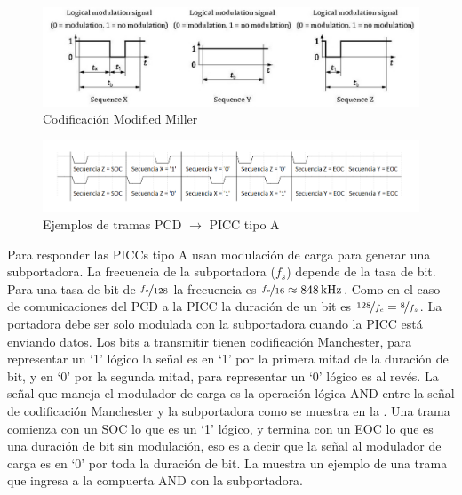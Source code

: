 \documentclass[a4paper, twoside, 11pt]{report}
\begin{document}
\begin{figure}[htb]
  \centering
  \includegraphics[scale=0.5]{./img/sequences}
  \caption{Codificación Modified Miller~\cite{iso14443-2}}
  \label{fig:sequences}
\end{figure}

\begin{figure}[htb]
  \centering
  \includegraphics[scale=0.45]{./img/rx_frame_examples}
  \caption{Ejemplos de tramas PCD $\rightarrow$ PICC tipo A}
  \label{fig:rx_frame_examples}
\end{figure}

\FloatBarrier

Para responder las PICCs tipo A usan modulación de carga para generar una subportadora.  La frecuencia de la subportadora ($f_s$) depende de la tasa de bit. Para una tasa de bit de $\nicefrac{f_c}{128}$ la frecuencia es $\nicefrac{f_c}{16} \approx \SI{848}{\kilo\hertz}$. Como en el caso de comunicaciones del PCD a la PICC la duración de un bit es $\nicefrac{128}{f_c} = \nicefrac{8}{f_s}$. La portadora debe ser solo modulada con la subportadora cuando la PICC está enviando datos. Los bits a transmitir tienen codificación Manchester, para representar un ‘1’ lógico la señal es en ‘1’ por la primera mitad de la duración de bit, y en ‘0’ por la segunda mitad, para representar un ‘0’ lógico es al revés. La señal que maneja el modulador de carga es la operación lógica AND entre la señal de codificación Manchester y la subportadora como se muestra en la . Una trama comienza con un SOC lo que es un ‘1’ lógico, y termina con un EOC lo que es una duración de bit sin modulación, eso es a decir que la señal al modulador de carga es en ‘0’ por toda la duración de bit. La  muestra un ejemplo de una trama que ingresa a la compuerta AND con la subportadora.
\end{document}
